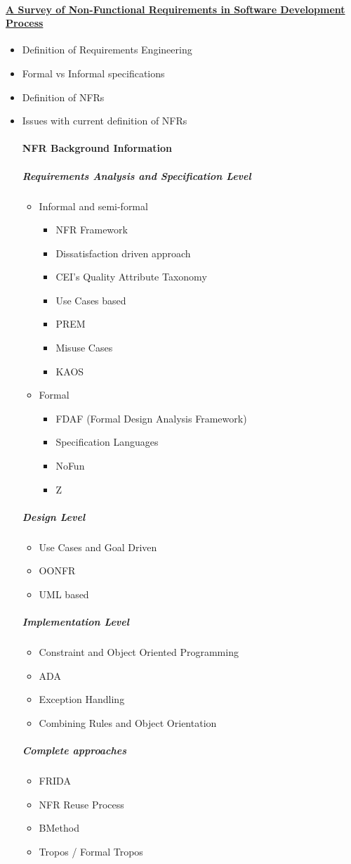 \documentclass[dissertation]{softeng}
\begin{document}
\paragraph*{\underline{A Survey of Non-Functional Requirements in Software Development Process}}\cite{Matoussi:2008wr}
\begin{itemize}
\item Definition of Requirements Engineering
\item Formal vs Informal specifications
\item Definition of NFRs
\item Issues with current definition of NFRs

\paragraph{NFR Background Information}
\subparagraph{Requirements Analysis and Specification Level}
\begin{itemize}
\item Informal and semi-formal
\begin{itemize}
\item NFR Framework
\item Dissatisfaction driven approach
\item CEI's Quality Attribute Taxonomy
\item Use Cases based
\item PREM
\item Misuse Cases
\item KAOS
\end{itemize}
\item Formal
\begin{itemize}
\item FDAF (Formal Design Analysis Framework)
\item Specification Languages 
\item NoFun
\item Z
\end{itemize}
\end{itemize}
\subparagraph{Design Level}
\begin{itemize}
\item Use Cases and Goal Driven 
\item OONFR
\item UML based
\end{itemize}
\subparagraph{Implementation Level}
\begin{itemize}
\item Constraint and Object Oriented Programming
\item ADA
\item Exception Handling
\item Combining Rules and Object Orientation
\end{itemize}
\subparagraph{Complete approaches}
\begin{itemize}
\item FRIDA
\item NFR Reuse Process
\item BMethod
\item Tropos / Formal Tropos
\end{itemize}
\end{itemize}
\pagebreak
\end{document}
